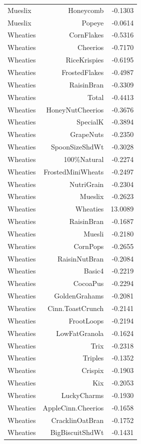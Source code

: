\begin{longtable}{@{}lrr@{}}
Mueslix & Honeycomb & -0.1303 \\
Mueslix & Popeye & -0.0614 \\
Wheaties & CornFlakes & -0.5316 \\
Wheaties & Cheerios & -0.7170 \\
Wheaties & RiceKrispies & -0.6195 \\
Wheaties & FrostedFlakes & -0.4987 \\
Wheaties & RaisinBran & -0.3309 \\
Wheaties & Total & -0.4413 \\
Wheaties & HoneyNutCheerios & -0.3676 \\
Wheaties & SpecialK & -0.3894 \\
Wheaties & GrapeNuts & -0.2350 \\
Wheaties & SpoonSizeShdWt & -0.3028 \\
Wheaties & 100\%Natural & -0.2274 \\
Wheaties & FrostedMiniWheats & -0.2497 \\
Wheaties & NutriGrain & -0.2304 \\
Wheaties & Mueslix & -0.2623 \\
Wheaties & Wheaties & 13.0089 \\
Wheaties & RaisinBran & -0.1687 \\
Wheaties & Muesli & -0.2180 \\
Wheaties & CornPops & -0.2655 \\
Wheaties & RaisinNutBran & -0.2084 \\
Wheaties & Basic4 & -0.2219 \\
Wheaties & CocoaPus & -0.2294 \\
Wheaties & GoldenGrahams & -0.2081 \\
Wheaties & Cinn.ToastCrunch & -0.2141 \\
Wheaties & FrootLoops & -0.2194 \\
Wheaties & LowFatGranola & -0.1624 \\
Wheaties & Trix & -0.2318 \\
Wheaties & Triples & -0.1352 \\
Wheaties & Crispix & -0.1903 \\
Wheaties & Kix & -0.2053 \\
Wheaties & LuckyCharms & -0.1930 \\
Wheaties & AppleCinn.Cheerios & -0.1658 \\
Wheaties & CracklinOatBran & -0.1752 \\
Wheaties & BigBiscuitShdWt & -0.1431 \\

\end{longtable}
